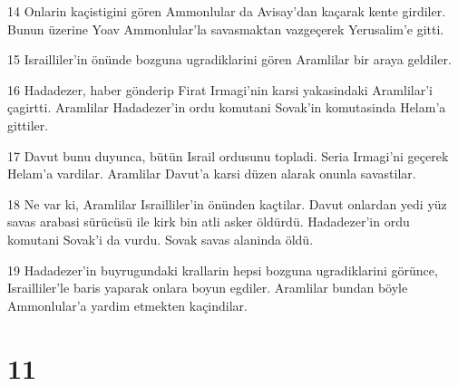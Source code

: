 \par 14 Onlarin kaçistigini gören Ammonlular da Avisay'dan kaçarak kente girdiler. Bunun üzerine Yoav Ammonlular'la savasmaktan vazgeçerek Yerusalim'e gitti.
\par 15 Israilliler'in önünde bozguna ugradiklarini gören Aramlilar bir araya geldiler.
\par 16 Hadadezer, haber gönderip Firat Irmagi'nin karsi yakasindaki Aramlilar'i çagirtti. Aramlilar Hadadezer'in ordu komutani Sovak'in komutasinda Helam'a gittiler.
\par 17 Davut bunu duyunca, bütün Israil ordusunu topladi. Seria Irmagi'ni geçerek Helam'a vardilar. Aramlilar Davut'a karsi düzen alarak onunla savastilar.
\par 18 Ne var ki, Aramlilar Israilliler'in önünden kaçtilar. Davut onlardan yedi yüz savas arabasi sürücüsü ile kirk bin atli asker öldürdü. Hadadezer'in ordu komutani Sovak'i da vurdu. Sovak savas alaninda öldü.
\par 19 Hadadezer'in buyrugundaki krallarin hepsi bozguna ugradiklarini görünce, Israilliler'le baris yaparak onlara boyun egdiler. Aramlilar bundan böyle Ammonlular'a yardim etmekten kaçindilar.

\chapter{11}

